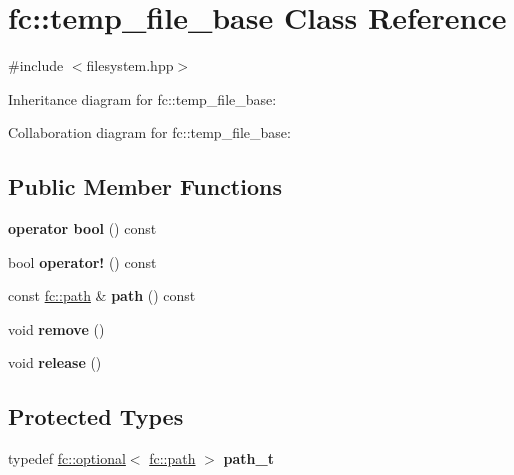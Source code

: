 \hypertarget{classfc_1_1temp__file__base}{}\section{fc\+:\+:temp\+\_\+file\+\_\+base Class Reference}
\label{classfc_1_1temp__file__base}


{\ttfamily \#include $<$filesystem.\+hpp$>$}



Inheritance diagram for fc\+:\+:temp\+\_\+file\+\_\+base\+:


Collaboration diagram for fc\+:\+:temp\+\_\+file\+\_\+base\+:
\subsection*{Public Member Functions}
\begin{DoxyCompactItemize}
\item 
\mbox{\label{classfc_1_1temp__file__base_acaeded53c182bd84c6f76ebbf38f76ce}} 
{\bfseries operator bool} () const
\item 
\mbox{\label{classfc_1_1temp__file__base_aa22f86ff2cd875a66bd61f6dbececed7}} 
bool {\bfseries operator!} () const
\item 
\mbox{\label{classfc_1_1temp__file__base_a7ef88f2ed75bf87d276a80ce9283c55e}} 
const \mbox{\hyperlink{classfc_1_1path}{fc\+::path}} \& {\bfseries path} () const
\item 
\mbox{\label{classfc_1_1temp__file__base_a11fa97c029408fca1d14dfc5ca81be26}} 
void {\bfseries remove} ()
\item 
\mbox{\label{classfc_1_1temp__file__base_af4d8e3fc0f2dc6d9574492d1e23caffe}} 
void {\bfseries release} ()
\end{DoxyCompactItemize}
\subsection*{Protected Types}
\begin{DoxyCompactItemize}
\item 
\mbox{\label{classfc_1_1temp__file__base_a6c5d734a924b0d93a424ae3d4585abce}} 
typedef \mbox{\hyperlink{classfc_1_1optional}{fc\+::optional}}$<$ \mbox{\hyperlink{classfc_1_1path}{fc\+::path}} $>$ {\bfseries path\+\_\+t}
\end{DoxyCompactItemize}
